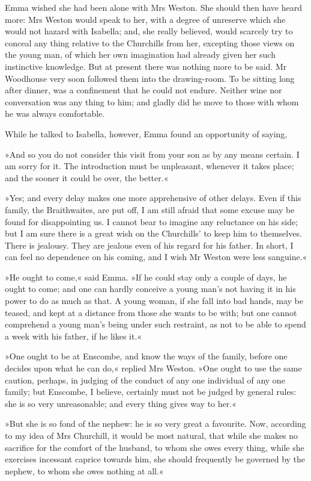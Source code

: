 Emma wished she had been alone with Mrs Weston. She should then have heard more: Mrs Weston would speak to her, with a degree of unreserve which she would not hazard with Isabella; and, she really believed, would scarcely try to conceal any thing relative to the Churchills from her, excepting those views on the young man, of which her own imagination had already given her such instinctive knowledge. But at present there was nothing more to be said. Mr Woodhouse very soon followed them into the drawing-room. To be sitting long after dinner, was a confinement that he could not endure. Neither wine nor conversation was any thing to him; and gladly did he move to those with whom he was always comfortable.

While he talked to Isabella, however, Emma found an opportunity of saying,

»And so you do not consider this visit from your son as by any means certain. I am sorry for it. The introduction must be unpleasant, whenever it takes place; and the sooner it could be over, the better.«

»Yes; and every delay makes one more apprehensive of other delays. Even if this family, the Braithwaites, are put off, I am still afraid that some excuse may be found for disappointing us. I cannot bear to imagine any reluctance on his side; but I am sure there is a great wish on the Churchills' to keep him to themselves. There is jealousy. They are jealous even of his regard for his father. In short, I can feel no dependence on his coming, and I wish Mr Weston were less sanguine.«

»He ought to come,« said Emma. »If he could stay only a couple of days, he ought to come; and one can hardly conceive a young man's not having it in his power to do as much as that. A young woman, if she fall into bad hands, may be teased, and kept at a distance from those she wants to be with; but one cannot comprehend a young man's being under such restraint, as not to be able to spend a week with his father, if he likes it.«

»One ought to be at Enscombe, and know the ways of the family, before one decides upon what he can do,« replied Mrs Weston. »One ought to use the same caution, perhaps, in judging of the conduct of any one individual of any one family; but Enscombe, I believe, certainly must not be judged by general rules: she is so very unreasonable; and every thing gives way to her.«

»But she is so fond of the nephew: he is so very great a favourite. Now, according to my idea of Mrs Churchill, it would be most natural, that while she makes no sacrifice for the comfort of the husband, to whom she owes every thing, while she exercises incessant caprice towards him, she should frequently be governed by the nephew, to whom she owes nothing at all.«

